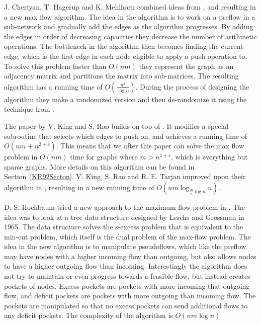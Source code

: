J. Cheriyan, T. Hagerup and K. Mehlhorn \cite{Cheriyan1990} combined ideas from \cite{Goldberg1988}, \cite{AO1989} and \cite{Cheriyan1989}
resulting in a new max flow algorithm.
The idea in the algorithm is to work on a preflow in a sub-network and gradually
add the edges as the algorithm progresses. By adding the edges in order of decreasing
capacities they decrease the number of arithmetic operations. The bottleneck in the algorithm then becomes finding the current-edge, 
which is the first edge in each node eligible to apply a push operation to.
To solve this problem faster than $O(nm)$ they represent the graph as an adjacency matrix and
partitions the matrix into sub-matrices. The resulting algorithm has a running time of $O(\frac{n^3}{\log{n}})$. 
During the process of designing the algorithm they make a randomized version and then de-randomize it using the technique from \cite{Alon1990}.

The paper by V. King and S. Rao \cite{King1992} builds on top of \cite{AO1989}. 
It modifies a special subroutine that selects which edges to push on, and achieves a running time of $O(nm +n^{2+\varepsilon})$.
This means that we after this paper can solve the max flow problem in $O(nm)$ time for graphs where $m>n^{1+\varepsilon}$, which is everything but sparse graphs.
More details on this algorithm can be found in Section~\ref{KR92Secton}.
V. King, S. Rao and R. E. Tarjan improved upon their algorithm in \cite{King1994}, resulting in a new running time of 
$O(nm\log_{\frac{m}{n}\log{n}}{n})$.

D. S. Hochbaum tried a new approach to the maximum flow problem in \cite{Hochbaum1998}. The idea was to look at a tree data structure
designed by Lerchs and Grossman in 1965. The data structure solves the s-excess problem that is equivalent to the min-cut problem,
which itself is the dual problem of the max-flow problem.
The idea in the new algorithm is to manipulate pseudoflows, which like the preflow may have nodes with a higher incoming flow than outgoing,
but also allows nodes to have a higher outgoing flow than incoming. Interestingly the algorithm does not try to maintain or even progress towards a feasible flow, 
but instead creates pockets of nodes. Excess pockets are pockets with more incoming that outgoing flow, and deficit pockets are pockets with more outgoing than incoming flow.
The pockets are manipulated so that no excess pockets can send additional flows to any deficit pockets.
The complexity of the algorithm is $O(nm\log{n})$


